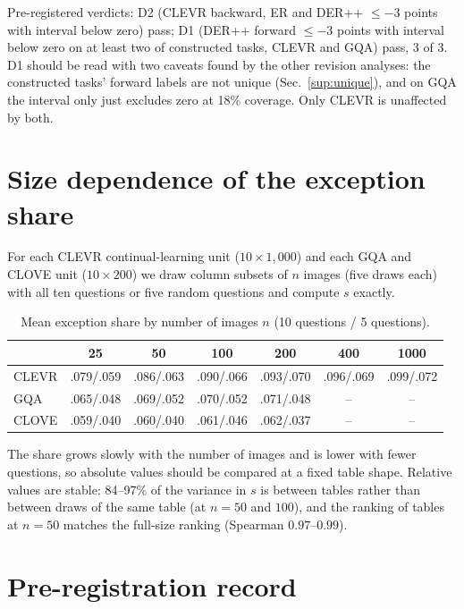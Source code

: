 \noindent
Pre-registered verdicts: D2 (CLEVR backward, ER and DER++ $\le-3$ points with interval below zero) pass; D1 (DER++
forward $\le-3$ points with interval below zero on at least two of constructed tasks, CLEVR and GQA) pass, 3 of 3.
D1 should be read with two caveats found by the other revision analyses: the constructed tasks' forward labels are not
unique (Sec.~\ref{sup:unique}), and on GQA the interval only just excludes zero at 18\% coverage. Only CLEVR is
unaffected by both.

\section{Size dependence of the exception share}
\label{sup:stability}

For each CLEVR continual-learning unit ($10\times1{,}000$) and each GQA and CLOVE unit ($10\times200$) we draw column
subsets of $n$ images (five draws each) with all ten questions or five random questions and compute $s$ exactly.

\begin{table}[h]
\centering\small\setlength{\tabcolsep}{3pt}
\caption{Mean exception share by number of images $n$ (10 questions / 5 questions).}
\label{tab:sup_stability}
\begin{tabular}{lcccccc}
\toprule
 & 25 & 50 & 100 & 200 & 400 & 1000 \\
\midrule
CLEVR & .079/.059 & .086/.063 & .090/.066 & .093/.070 & .096/.069 & .099/.072 \\
GQA   & .065/.048 & .069/.052 & .070/.052 & .071/.048 & -- & -- \\
CLOVE & .059/.040 & .060/.040 & .061/.046 & .062/.037 & -- & -- \\
\bottomrule
\end{tabular}
\end{table}

\noindent
The share grows slowly with the number of images and is lower with fewer questions, so absolute values should be
compared at a fixed table shape. Relative values are stable: 84--97\% of the variance in $s$ is between tables rather
than between draws of the same table (at $n=50$ and $100$), and the ranking of tables at $n=50$ matches the full-size
ranking (Spearman $0.97$--$0.99$).

\section{Pre-registration record}
\label{sup:prereg}

